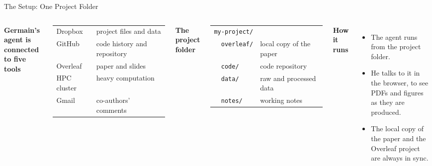 \documentclass[svgnames,x11names,dvipsnames]{beamer}
\begin{document}
\begin{frame}{The Setup: One Project Folder}

\small
\begin{columns}[T]
\textbf{Germain's agent is connected to five tools}

\vspace{0.1cm}
{\footnotesize
\begin{tabular}{@{}ll@{}}
Dropbox & project files and data \\
GitHub & code history and repository \\
Overleaf & paper and slides \\
HPC cluster & heavy computation \\
Gmail & co-authors' comments \\
\end{tabular}}

\vspace{0.35cm}
\textbf{The project folder}

\vspace{0.1cm}
{\footnotesize
\begin{tabular}{@{}ll@{}}
\texttt{my-project/} & \\
\texttt{\ \ overleaf/} & local copy of the paper \\
\texttt{\ \ code/} & code repository \\
\texttt{\ \ data/} & raw and processed data \\
\texttt{\ \ notes/} & working notes \\
\end{tabular}}

\textbf{How it runs}
\begin{itemize}
    \setlength{\itemsep}{3pt}
    \item The agent runs from the project folder.
    \item He talks to it in the browser, to see PDFs and figures as they are produced.
    \item The local copy of the paper and the Overleaf project are always in sync.
\end{itemize}
\end{columns}

\end{frame}
\end{document}
